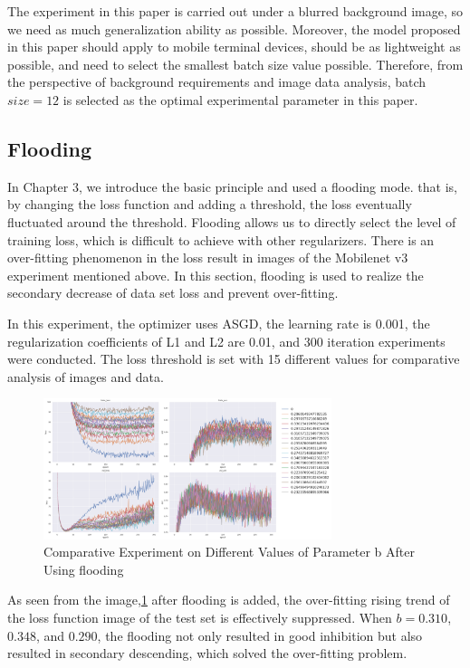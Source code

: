 \documentclass[a4paper,fleqn]{cas-sc}
\begin{document}
The experiment in this paper is carried out under a blurred background image, so we need as much generalization ability as possible. Moreover, the model proposed in this paper should apply to mobile terminal devices, should be as lightweight as possible, and need to select the smallest batch size value possible. Therefore, from the perspective of background requirements and image data analysis, batch $size=12$ is selected as the optimal experimental parameter in this paper.

\subsection{Flooding}
In Chapter 3, we introduce the basic principle and used a flooding mode. that is, by changing the loss function and adding a threshold, the loss eventually fluctuated around the threshold. Flooding allows us to directly select the level of training loss, which is difficult to achieve with other regularizers. There is an over-fitting phenomenon in the loss result in images of the Mobilenet v3 experiment mentioned above. In this section, flooding is used to realize the secondary decrease of data set loss and prevent over-fitting. 

In this experiment, the optimizer uses ASGD, the learning rate is 0.001, the regularization coefficients of L1 and L2 are 0.01, and 300 iteration experiments were conducted. The loss threshold is set with 15 different values for comparative analysis of images and data.
\begin{figure}
\centering
\includegraphics[width=0.75\textwidth]{figs_rev1/f7.png}
\caption{Comparative Experiment on Different Values of Parameter b After Using flooding}
\label{fig:f7}
\end{figure}

As seen from the image,\ref{fig:f7} after flooding is added, the over-fitting rising trend of the loss function image of the test set is effectively suppressed. When $b=0.310$, $0.348$, and $0.290$, the flooding not only resulted in good inhibition but also resulted in secondary descending, which solved the over-fitting problem.
\end{document}
